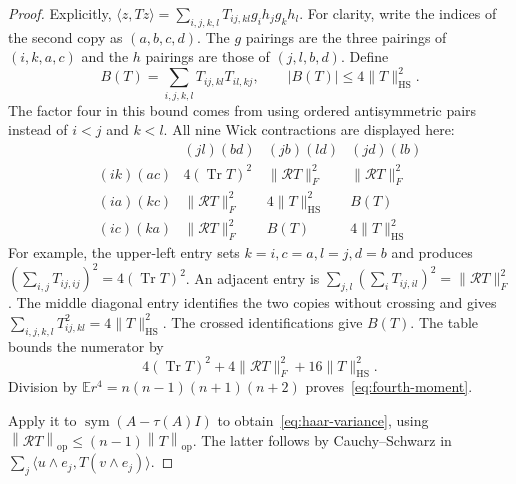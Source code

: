 \documentclass[11pt]{article}
\theoremstyle{definition}\newtheorem{definition}[theorem]{Definition}
\theoremstyle{remark}\newtheorem{remark}[theorem]{Remark}
\DeclareMathOperator{\Tr}{Tr}
\newcommand{\E}{\mathbb E}
\newcommand{\R}{\mathcal R}
\newcommand{\op}{\mathrm{op}}
\newcommand{\HS}{\mathrm{HS}}
\newcommand{\ip}[2]{\langle#1,#2\rangle}
\newcommand{\norm}[1]{\left\lVert#1\right\rVert}
\begin{document}
\begin{proof}
Explicitly,
$\ip z{Tz}=\sum_{i,j,k,l}T_{ij,kl}g_i h_j g_k h_l$.
For clarity, write the indices of the second copy as $(a,b,c,d)$. The $g$ pairings are the three pairings of $(i,k,a,c)$ and the $h$ pairings are those of $(j,l,b,d)$. Define
\[
 B(T)=\sum_{i,j,k,l}T_{ij,kl}T_{il,kj},\qquad
 |B(T)|\le4\|T\|_{\HS}^2.
\]
The factor four in this bound comes from using ordered antisymmetric pairs instead of $i<j$ and $k<l$. All nine Wick contractions are displayed here:
\[
\begin{array}{c|ccc}
 & (jl)(bd)&(jb)(ld)&(jd)(lb)\\ \hline
 (ik)(ac)&4(\Tr T)^2&\|\R T\|_F^2&\|\R T\|_F^2\\
 (ia)(kc)&\|\R T\|_F^2&4\|T\|_{\HS}^2&B(T)\\
 (ic)(ka)&\|\R T\|_F^2&B(T)&4\|T\|_{\HS}^2
\end{array}
\]
For example, the upper-left entry sets $k=i,c=a,l=j,d=b$ and produces
$(\sum_{i,j}T_{ij,ij})^2=4(\Tr T)^2$. An adjacent entry is
$\sum_{j,l}(\sum_iT_{ij,il})^2=\|\R T\|_F^2$. The middle diagonal entry identifies the two copies without crossing and gives $\sum_{i,j,k,l}T_{ij,kl}^2=4\|T\|_{\HS}^2$. The crossed identifications give $B(T)$. The table bounds the numerator by
\[
 4(\Tr T)^2+4\|\R T\|_F^2+16\|T\|_{\HS}^2.
\]
Division by $\E r^4=n(n-1)(n+1)(n+2)$ proves~\eqref{eq:fourth-moment}.

Apply it to $\operatorname{sym}(A-\tau(A)I)$ to obtain~\eqref{eq:haar-variance}, using $\norm{\R T}_{\op}\le(n-1)\norm T_{\op}$. The latter follows by Cauchy--Schwarz in
$\sum_j\ip{u\wedge e_j}{T(v\wedge e_j)}$.


\end{proof}
\end{document}

